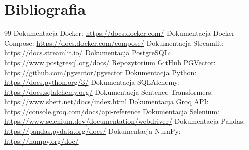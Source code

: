 \documentclass{article}
\begin{document}
\section{Bibliografia}
\begin{thebibliography}{99}
     Dokumentacja Docker: \url{https://docs.docker.com/}
     Dokumentacja Docker Compose: \url{https://docs.docker.com/compose/}
     Dokumentacja Streamlit: \url{https://docs.streamlit.io/}
     Dokumentacja PostgreSQL: \url{https://www.postgresql.org/docs/}
     Repozytorium GitHub PGVector: \url{https://github.com/pgvector/pgvector}
     Dokumentacja Python: \url{https://docs.python.org/3/}
     Dokumentacja SQLAlchemy: \url{https://docs.sqlalchemy.org/}
     Dokumentacja Sentence-Transformers: \url{https://www.sbert.net/docs/index.html}
     Dokumentacja Groq API: \url{https://console.groq.com/docs/api-reference}
     Dokumentacja Selenium: \url{https://www.selenium.dev/documentation/webdriver/}
     Dokumentacja Pandas: \url{https://pandas.pydata.org/docs/}
     Dokumentacja NumPy: \url{https://numpy.org/doc/}
\end{thebibliography}
\end{document}
